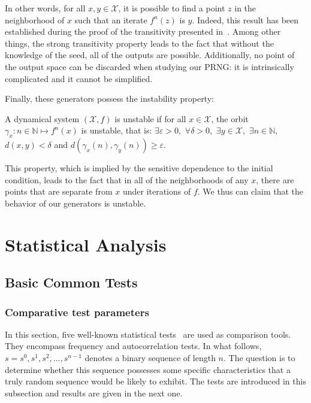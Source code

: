 \documentclass[journal]{IEEEtran}
\begin{document}
In other words, for all $x,y \in \mathcal{X}$, it is possible to find a point $z$ in the neighborhood of $x$ such that an iterate $f^n(z)$ is $y$. Indeed, this result has been established during the proof of the transitivity presented in~\cite{guyeux09}. Among other things, the strong transitivity property leads to the fact that without the knowledge of the seed, all of the outputs are possible. Additionally, no point of the output space can be discarded when studying our PRNG: it is intrinsically complicated and it cannot be simplified.

Finally, these generators possess the instability property:

\begin{definition}
A dynamical system $\left( \mathcal{X}, f\right)$ is unstable if for all $x \in \mathcal{X}$, the orbit $\gamma_x:n \in \mathds{N} \longmapsto f^n(x)$ is unstable, that is: $\exists \varepsilon > 0,$ $\forall \delta > 0,$ $\exists y \in \mathcal{X},$ $\exists n \in \mathds{N},$ $d(x,y) < \delta$ and $d\left(\gamma_x(n), \gamma_y(n)\right) \geqslant \varepsilon.$
\end{definition}

This property, which is implied by the sensitive dependence to the initial condition, leads to the fact that in all of the neighborhoods of any $x$, there are points that are separate from $x$ under iterations of $f$. We thus can claim that the behavior of our generators is unstable.

\section{Statistical Analysis}
\label{Comparative analysis}
\subsection{Basic Common Tests}


\subsubsection{Comparative test parameters}
In this section, five well-known statistical tests~\cite{Menezes1997} are used as comparison tools. They encompass frequency and autocorrelation tests. In what follows, $s = s^0,s^1,s^2,\dots , s^{n-1}$ denotes a binary sequence of length $n$. The question is to determine whether this sequence possesses some specific characteristics that a truly random sequence would be likely to exhibit. The tests are introduced in this subsection and results are given in the next one.
\end{document}
